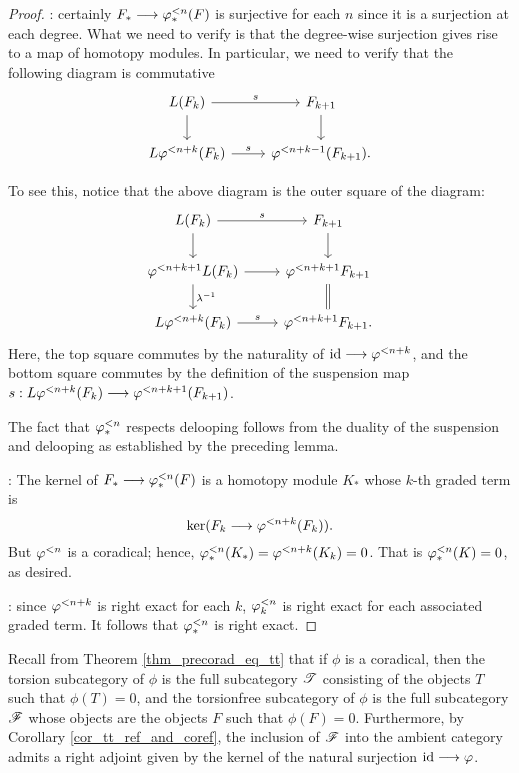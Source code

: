 \begin{proof}
: certainly $F_* \to 
\tlHM{n}(F)$ is surjective for each $n$ since it is a surjection 
at each degree. What we need to verify is that the degree-wise 
surjection gives rise to a map of homotopy modules. In particular, 
we need to verify that the following diagram is commutative
\[
\begin{tikzcd}
L(F_k) \arrow{r}{\susp} \arrow{d} &
F_{k + 1} \arrow{d} \\
L \tlHI{n + k}(F_k) \arrow{r}{\susp} &
\tlHI{n + k - 1}(F_{k + 1}).
\end{tikzcd}
\]

To see this, notice that the above diagram is the outer 
square of the diagram:
\[
\begin{tikzcd}
L(F_k) \arrow{r}{\susp} \arrow{d} &
F_{k + 1} \arrow{d} \\
\tlHI{n + k + 1} L(F_k) \arrow{r} \arrow{d}{\lambda^{-1}} &
\tlHI{n + k + 1} F_{k + 1} \arrow[equals]{d} \\
L \tlHI{n + k}(F_k) \arrow{r}{\susp} &
\tlHI{n + k + 1} F_{k + 1}.
\end{tikzcd}
\]
Here, the top square commutes by the naturality of $\id \to 
\tlHI{n + k}$, and the bottom square commutes by the definition of 
the suspension map 
$\susp: L \tlHI{n + k}(F_k) \to \tlHI{n + k + 1}(F_{k + 1})$. 

The fact that $\tlHM{n}$ respects delooping follows from 
the duality of the suspension and delooping as established by the
preceding lemma.

: The kernel of $F_* \to 
\tlHM{n}(F)$ is a homotopy module $K_*$ whose $k$-th graded term is 
\[
\mathrm{ker}(F_k \to \tlHI{n + k}(F_k)). 
\]
But $\tlHI{n}$ is a coradical; hence, $\tlHM{n}(K_*) = 
\tlHI{n + k}(K_k) = 0$. That is $\tlHM{n}(K) = 0$, as desired.

: since $\tlHI{n + k}$ is 
right exact for each $k$, $\tlHM[k]{n}$ is right exact for each 
associated graded term. It follows that $\tlHM{n}$ is right exact.
\end{proof}

Recall from Theorem \ref{thm_precorad_eq_tt} that if $\phi$ is 
a coradical, then the torsion subcategory of $\phi$ is the full 
subcategory $\Cat{T}$ consisting of the objects $T$ such that 
$\phi(T) = 0$, and the torsionfree subcategory of $\phi$ is the 
full subcategory $\Cat{F}$ whose objects are the objects $F$ such 
that $\phi(F) = 0$. Furthermore, by Corollary 
\ref{cor_tt_ref_and_coref}, the inclusion of $\Cat{F}$ into the
ambient category admits a right adjoint given by the kernel of
the natural surjection $\id \to \phi$. 


